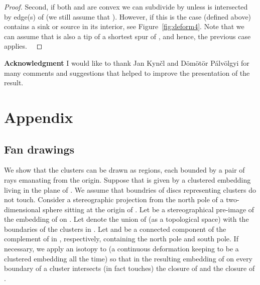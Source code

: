 \documentclass{llncs}
\def\qed{ \ \vrule width.2cm height.2cm depth0cm\smallskip}
\begin{document}
\begin{proof}
   
Second, if both  and  are convex we can subdivide  by  unless  is intersected by edge(s) of  (we still assume that  ).
   However, if this is the case  (defined above) contains a sink or source  in its interior, see Figure~\ref{fig:deform4}. Note that we can assume that  is also a tip of a shortest spur of , and hence, the previous case applies.\fi
\qed\end{proof}



	










{\bf Acknowledgment} I would like to thank Jan Kyn\v{c}l and D\"om\"ot\"or P\'alv\"olgyi for many comments and suggestions that helped to improve the presentation of the result.


	
	
	




 


 
 

 
   









\newpage


\section*{Appendix}


\subsection*{Fan drawings}
\label{sec:fan}
We show that the clusters can be drawn as regions, each bounded by a pair of rays emanating from the origin.
Suppose that  is given by a clustered embedding
living in the  plane of .
We assume that boundries of discs representing clusters do not touch.
Consider a stereographic projection from the north pole of a two-dimensional sphere  
sitting at the origin of .
Let  be a stereographical pre-image of the embedding of  on .
Let  denote the union of  (as a topological space) with the boundaries of the clusters in .
Let  and  be a connected component of the complement of  in , respectively, containing the north pole and south pole.
If necessary, we apply an isotopy  to  (a continuous deformation keeping  to be a clustered embedding all the time)  so that in the resulting embedding  of  on  every boundary of a cluster intersects (in fact touches) the closure of  and  the closure of . 
\end{document}
